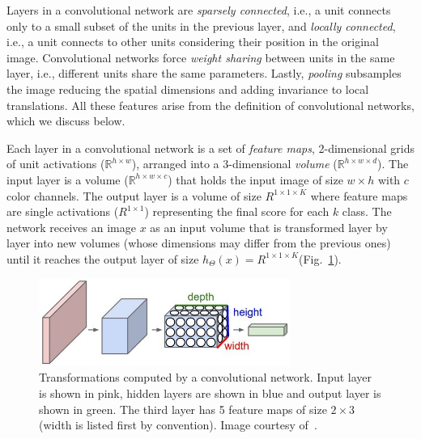 Layers in a convolutional network are \emph{sparsely connected}, i.e., a unit connects only to a small subset of the units in the previous layer, and \emph{locally connected}, i.e., a unit connects to other units considering their position in the original image. Convolutional networks force \emph{weight sharing} between units in the same layer, i.e., different units share the same parameters. Lastly, \emph{pooling} subsamples the image reducing the spatial dimensions and adding invariance to local translations. All these features arise from the definition of convolutional networks, which we discuss below.

Each layer in a convolutional network is a set of \emph{feature maps}, 2-dimensional grids of unit activations ($\mathbb{R}^{h\times w}$), arranged into a 3-dimensional \emph{volume} ($\mathbb{R}^{h\times w \times d}$).
The input layer is a volume ($\mathbb{R}^{h\times w \times c}$) that holds the input image of size $w\times h$ with $c$ color channels. The output layer is a volume of size $R^{1\times 1 \times K}$ where feature maps are single activations ($R^{1\times 1}$) representing the final score for each $k$ class. The network receives an image $x$ as an input volume that is transformed layer by layer into new volumes (whose dimensions may differ from the previous ones) until it reaches the output layer of size $h_\Theta(x) = R^{1\times 1 \times K}$(Fig.~\ref{fig:ConvNetVolumes}).

\begin{figure}[h]
	\centering
	\includegraphics[width = 0.73\textwidth]{plots/convNetVolumes.jpeg}
	\caption[Illustration of a convolutional network]{Transformations computed by a convolutional network. Input layer is shown in pink, hidden layers are shown in blue and output layer is shown in green. The third layer has 5 feature maps of size $2\times3$ (width is listed first by convention). Image courtesy of~\cite{Karpathy2016}.}
	\label{fig:ConvNetVolumes}
\end{figure}


